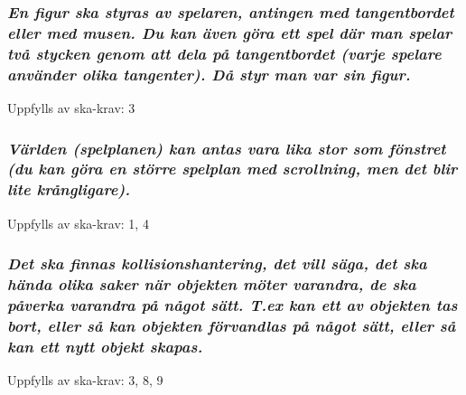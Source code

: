 \documentclass{TDP005mall}
\begin{document}
\subsubsection{\emph{ En figur ska styras av spelaren, antingen med tangentbordet eller med musen. Du kan även göra ett spel där man spelar två stycken genom att dela på tangentbordet (varje spelare använder olika tangenter). Då styr man var sin figur.}}
Uppfylls av ska-krav: 3

\subsubsection{\emph{ Världen (spelplanen) kan antas vara lika stor som fönstret (du kan göra en större spelplan med scrollning, men det blir lite krångligare).}}
Uppfylls av ska-krav: 1, 4

\subsubsection{\emph{ Det ska finnas kollisionshantering, det vill säga, det ska hända olika saker när objekten möter varandra, de ska påverka varandra på något sätt. T.ex kan ett av objekten tas bort, eller så kan objekten förvandlas på något sätt, eller så kan ett nytt objekt skapas.}}
Uppfylls av ska-krav: 3, 8, 9
\end{document}
